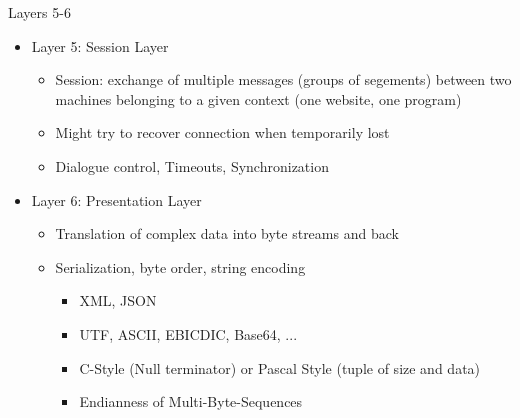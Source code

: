 \begin{frame}{Layers 5-6}
%
\begin{itemize}
\item Layer 5: Session Layer
	\begin{itemize}
	\item Session: exchange of multiple messages (groups of segements) between two machines belonging to a given context (\zB one website, one program)
	\item Might try to recover connection when temporarily lost
	\item Dialogue control, Timeouts, Synchronization
	\end{itemize}
\pause
\item Layer 6: Presentation Layer
	\begin{itemize}
	\item Translation of complex data into byte streams and back
	\item Serialization, byte order, string encoding
		\begin{itemize}
		\item XML, JSON
		\item UTF, ASCII, EBICDIC, Base64, ...
		\item C-Style (Null terminator) or Pascal Style (tuple of size and data)
		\item Endianness of Multi-Byte-Sequences
		\end{itemize}
	\end{itemize}
\end{itemize}
%
\end{frame}


